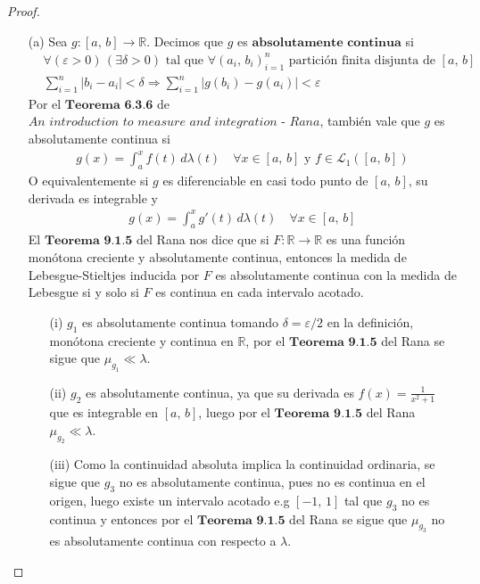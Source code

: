 \documentclass[12pt]{article}
\begin{document}
\begin{proof}
    \begin{itemize}
        \item[(a)] Sea $g : [a \text{, }b] \to \mathbb{R}$. Decimos que $g$ es $\textbf{absolutamente continua}$ si \begin{align*}
                   & \forall (\varepsilon > 0) \, (\exists \delta > 0) \text{ tal que } \forall (a_i\text{, } b_i)_{i = 1}^n \text{ partición finita disjunta de } [a\text{, }b] \\
                   & \sum_{i = 1}^n |b_i - a_i| < \delta \Rightarrow \sum_{i = 1}^n |g(b_i) - g(a_i)| < \varepsilon
              \end{align*}
              Por el $\textbf{Teorema 6.3.6}$ de $\textit{An introduction to measure and integration - Rana}$, también vale que $g$ es absolutamente continua si \begin{align*}
                  g(x) = \int_a^x f(t) \, d\lambda(t) \quad \forall x \in [a\text{, }b] \text{ y } f \in \mathcal{L}_1([a\text{, }b])
              \end{align*}
              O equivalentemente si $g$ es diferenciable en casi todo punto de $[a\text{, }b]$, su derivada es integrable y \begin{align*}
                  g(x) = \int_a^x g'(t) \, d\lambda(t) \quad \forall x \in [a\text{, }b]
              \end{align*}
              El $\textbf{Teorema 9.1.5}$ del Rana nos dice que si $F: \mathbb{R} \to \mathbb{R}$ es una función monótona creciente y absolutamente continua, entonces la medida de Lebesgue-Stieltjes inducida por $F$ es absolutamente continua con la medida de Lebesgue si y solo si $F$ es continua en cada intervalo acotado.
              \begin{itemize}
                  \item[(i)] $g_1$ es absolutamente continua tomando $\delta = \varepsilon / 2$ en la definición, monótona creciente y continua en $\mathbb{R}$, por el $\textbf{Teorema 9.1.5}$ del Rana se sigue que $\mu_{g_1} \ll \lambda$.
                  \item[(ii)] $g_2$ es absolutamente continua, ya que su derivada es $f(x) = \frac{1}{x^2+1}$ que es integrable en $[a\text{, }b]$, luego por el $\textbf{Teorema 9.1.5}$ del Rana $\mu_{g_2} \ll \lambda$.
                  \item[(iii)] Como la continuidad absoluta implica la continuidad ordinaria, se sigue que $g_3$ no es absolutamente continua, pues no es continua en el origen, luego existe un intervalo acotado e.g $[-1\text{, }1]$ tal que $g_3$ no es continua y entonces por el $\textbf{Teorema 9.1.5}$ del Rana se sigue que $\mu_{g_3}$ no es absolutamente continua con respecto a $\lambda$.

\end{itemize}
\end{itemize}
\end{proof}
\end{document}

